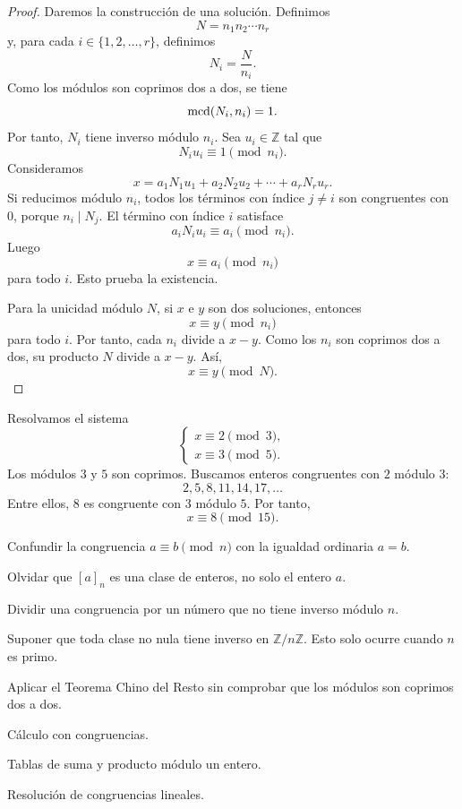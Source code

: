 \begin{proof}
Daremos la construcción de una solución. Definimos
\[
  N=n_1n_2\cdots n_r
\]
y, para cada \(i\in\{1,2,\ldots,r\}\), definimos
\[
  N_i=\frac{N}{n_i}.
\]
Como los módulos son coprimos dos a dos, se tiene
\[
  \operatorname{mcd}(N_i,n_i)=1.
\]
Por tanto, \(N_i\) tiene inverso módulo \(n_i\). Sea \(u_i\in\mathbb{Z}\) tal que
\[
  N_i u_i\equiv 1\pmod{n_i}.
\]
Consideramos
\[
  x=a_1N_1u_1+a_2N_2u_2+\cdots+a_rN_ru_r.
\]
Si reducimos módulo \(n_i\), todos los términos con índice \(j\neq i\) son congruentes con \(0\), porque \(n_i\mid N_j\). El término con índice \(i\) satisface
\[
  a_iN_iu_i\equiv a_i\pmod{n_i}.
\]
Luego
\[
  x\equiv a_i\pmod{n_i}
\]
para todo \(i\). Esto prueba la existencia.

Para la unicidad módulo \(N\), si \(x\) e \(y\) son dos soluciones, entonces
\[
  x\equiv y\pmod{n_i}
\]
para todo \(i\). Por tanto, cada \(n_i\) divide a \(x-y\). Como los \(n_i\) son coprimos dos a dos, su producto \(N\) divide a \(x-y\). Así,
\[
  x\equiv y\pmod N.
\]
\end{proof}

\begin{ejemplo}
Resolvamos el sistema
\[
\begin{cases}
  x\equiv 2 \pmod 3,\\
  x\equiv 3 \pmod 5.
\end{cases}
\]
Los módulos \(3\) y \(5\) son coprimos. Buscamos enteros congruentes con \(2\) módulo \(3\):
\[
  2,5,8,11,14,17,\ldots
\]
Entre ellos, \(8\) es congruente con \(3\) módulo \(5\). Por tanto,
\[
  x\equiv 8\pmod{15}.
\]
\end{ejemplo}

\begin{erroresfrecuentes}
  \item Confundir la congruencia \(a\equiv b\pmod n\) con la igualdad ordinaria \(a=b\).
  \item Olvidar que \([a]_n\) es una clase de enteros, no solo el entero \(a\).
  \item Dividir una congruencia por un número que no tiene inverso módulo \(n\).
  \item Suponer que toda clase no nula tiene inverso en \(\mathbb{Z}/n\mathbb{Z}\). Esto solo ocurre cuando \(n\) es primo.
  \item Aplicar el Teorema Chino del Resto sin comprobar que los módulos son coprimos dos a dos.
\end{erroresfrecuentes}

\begin{seminario}
  \item Cálculo con congruencias.
  \item Tablas de suma y producto módulo un entero.
  \item Resolución de congruencias lineales.
\end{seminario}

